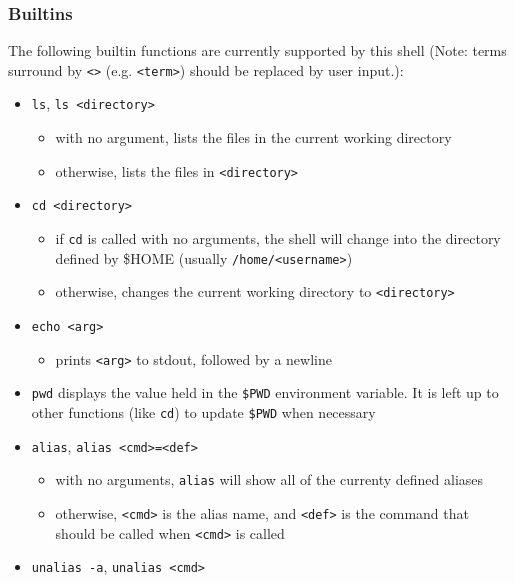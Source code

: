 \documentclass[]{article}
\providecommand{\tightlist}{%
  \setlength{\itemsep}{0pt}\setlength{\parskip}{0pt}}
\begin{document}
\subsubsection{Builtins}\label{builtins}

The following builtin functions are currently supported by this shell
(Note: terms surround by \texttt{\textless{}\textgreater{}} (e.g.
\texttt{\textless{}term\textgreater{}}) should be replaced by user
input.):

\begin{itemize}
\tightlist
\item
  \texttt{ls}, \texttt{ls\ \textless{}directory\textgreater{}}

  \begin{itemize}
  \tightlist
  \item
    with no argument, lists the files in the current working directory
  \item
    otherwise, lists the files in
    \texttt{\textless{}directory\textgreater{}}
  \end{itemize}
\item
  \texttt{cd\ \textless{}directory\textgreater{}}

  \begin{itemize}
  \tightlist
  \item
    if \texttt{cd} is called with no arguments, the shell will change
    into the directory defined by \$HOME (usually
    \texttt{/home/\textless{}username\textgreater{}})
  \item
    otherwise, changes the current working directory to
    \texttt{\textless{}directory\textgreater{}}
  \end{itemize}
\item
  \texttt{echo\ \textless{}arg\textgreater{}}

  \begin{itemize}
  \tightlist
  \item
    prints \texttt{\textless{}arg\textgreater{}} to stdout, followed by
    a newline
  \end{itemize}
\item
  \texttt{pwd} displays the value held in the \texttt{\$PWD} environment
  variable. It is left up to other functions (like \texttt{cd}) to
  update \texttt{\$PWD} when necessary
\item
  \texttt{alias},
  \texttt{alias\ \textless{}cmd\textgreater{}=\textless{}def\textgreater{}}

  \begin{itemize}
  \tightlist
  \item
    with no arguments, \texttt{alias} will show all of the currenty
    defined aliases
  \item
    otherwise, \texttt{\textless{}cmd\textgreater{}} is the alias name,
    and \texttt{\textless{}def\textgreater{}} is the command that should
    be called when \texttt{\textless{}cmd\textgreater{}} is called
  \end{itemize}
\item
  \texttt{unalias\ -a}, \texttt{unalias\ \textless{}cmd\textgreater{}}


\end{itemize}
\end{document}

